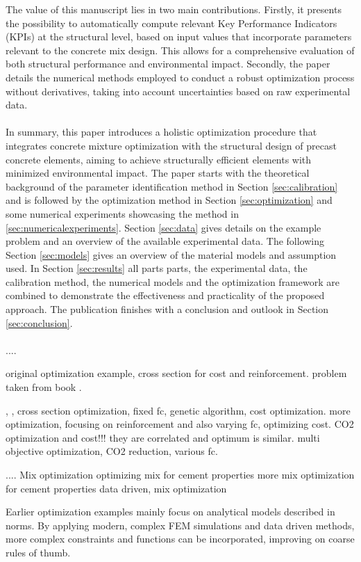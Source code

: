 %
The value of this manuscript lies in two main contributions. 
Firstly, it presents the possibility to automatically compute relevant Key Performance Indicators (KPIs) at the structural level, based on input values that incorporate parameters relevant to the concrete mix design. 
This allows for a comprehensive evaluation of both structural performance and environmental impact. 
Secondly, the paper details the numerical methods employed to conduct a robust optimization process without derivatives, taking into account uncertainties based on raw experimental data.
\\\\
In summary, this paper introduces a holistic optimization procedure that integrates concrete mixture optimization with the structural design of precast concrete elements, aiming to achieve structurally efficient elements with minimized environmental impact. 
The paper starts  with the theoretical background of the parameter identification method in Section \ref{sec:calibration} and is followed by the optimization method in Section \ref{sec:optimization} and some numerical experiments showcasing the method in \ref{sec:numericalexperiments}.
Section \ref{sec:data} gives details on the example problem and an overview of the available experimental data.
The following Section \ref{sec:models} gives an overview of the material models and assumption used. 
In Section \ref{sec:results} all parts parts, the experimental data, the calibration method, the numerical models and the optimization framework are combined to demonstrate the effectiveness and practicality of the proposed approach.
The publication finishes with a conclusion and outlook in Section \ref{sec:conclusion}.
\\\\


....

\cite{Chakrabarty_1992} original optimization example, cross section for cost and reinforcement.
problem taken from book \cite{everard1966reinforced}.

\cite{Coello_1997} , , cross section optimization, fixed fc, genetic algorithm, cost optimization.
\cite{Pierott_2021} more optimization, focusing on reinforcement and also varying fc, optimizing cost.
\cite{Paya_Zaforteza_2009} CO2 optimization and cost!!! they are correlated and optimum is similar.
\cite{dos_Santos_2023} multi objective optimization, CO2 reduction, various fc.

....
Mix optimization
\cite{Lisienkova_2021} optimizing mix for cement properties
\cite{Kondapally_2022} more mix optimization for cement properties
\cite{Shobeiri_2023} data driven, mix optimization



Earlier optimization examples mainly focus on analytical models described in norms.
By applying modern, complex FEM simulations and data driven methods, more complex constraints and functions can be incorporated, improving on coarse rules of thumb.


